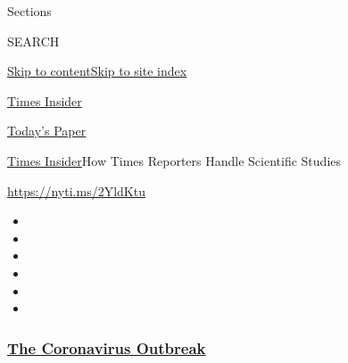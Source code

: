 Sections

SEARCH

\protect\hyperlink{site-content}{Skip to
content}\protect\hyperlink{site-index}{Skip to site index}

\href{https://www.nytimes3xbfgragh.onion/section/reader-center}{Times
Insider}

\href{https://myaccount.nytimes3xbfgragh.onion/auth/login?response_type=cookie\&client_id=vi}{}

\href{https://www.nytimes3xbfgragh.onion/section/todayspaper}{Today's
Paper}

\href{/section/reader-center}{Times Insider}\textbar{}How Times
Reporters Handle Scientific Studies

\url{https://nyti.ms/2YldKtu}

\begin{itemize}
\item
\item
\item
\item
\item
\item
\end{itemize}

\hypertarget{the-coronavirus-outbreak}{%
\subsubsection{\texorpdfstring{\href{https://www.nytimes3xbfgragh.onion/news-event/coronavirus?name=styln-coronavirus-national\&region=TOP_BANNER\&block=storyline_menu_recirc\&action=click\&pgtype=Article\&impression_id=3e70ded0-f4d4-11ea-850c-d13f9cab80f0\&variant=undefined}{The
Coronavirus
Outbreak}}{The Coronavirus Outbreak}}\label{the-coronavirus-outbreak}}

